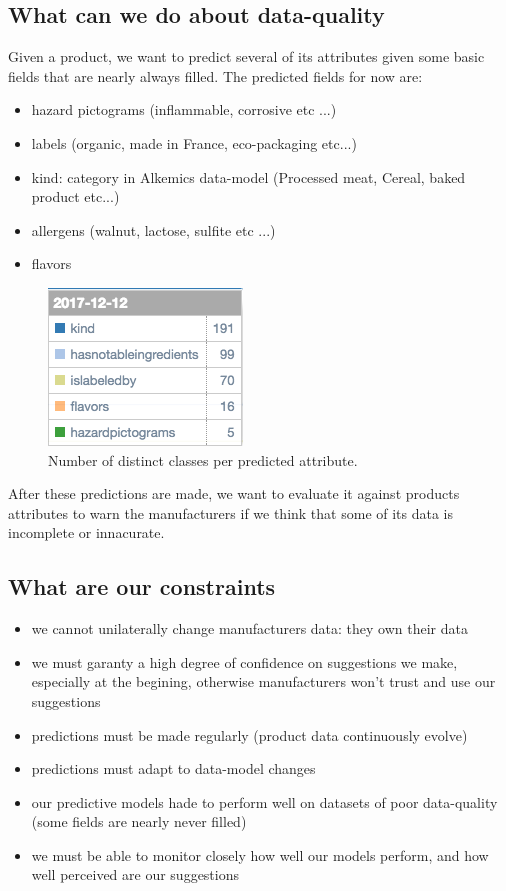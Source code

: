 \subsection{What can we do about data-quality}

Given a product, we want to predict several of its attributes given some basic fields that are nearly always filled.
The predicted fields for now are:
\begin{itemize}
	\item hazard pictograms (inflammable, corrosive etc ...)
	\item labels (organic, made in France, eco-packaging etc...)
	\item kind: category in Alkemics data-model (Processed meat, Cereal, baked product etc...)
	\item allergens (walnut, lactose, sulfite etc ...)
	\item flavors
\end{itemize}

\begin{figure}[H]
\centering
\includegraphics[scale=0.55]{./images/workflow/predicted_fields.png}
\caption{Number of distinct classes per predicted attribute.}
\end{figure}

After these predictions are made, we want to evaluate it against products attributes to warn the manufacturers if we think that some of its data is incomplete or innacurate.

\subsection{What are our constraints}
\begin{itemize}
\item we cannot unilaterally change manufacturers data: they own their data
\item we must garanty a high degree of confidence on suggestions we make, especially at the begining, otherwise manufacturers won't trust and use our suggestions
\item predictions must be made regularly (product data continuously evolve)
\item predictions must adapt to data-model changes
\item our predictive models hade to perform well on datasets of poor data-quality (some fields are nearly never filled)
\item we must be able to monitor closely how well our models perform, and how well perceived are our suggestions 
\end{itemize}


